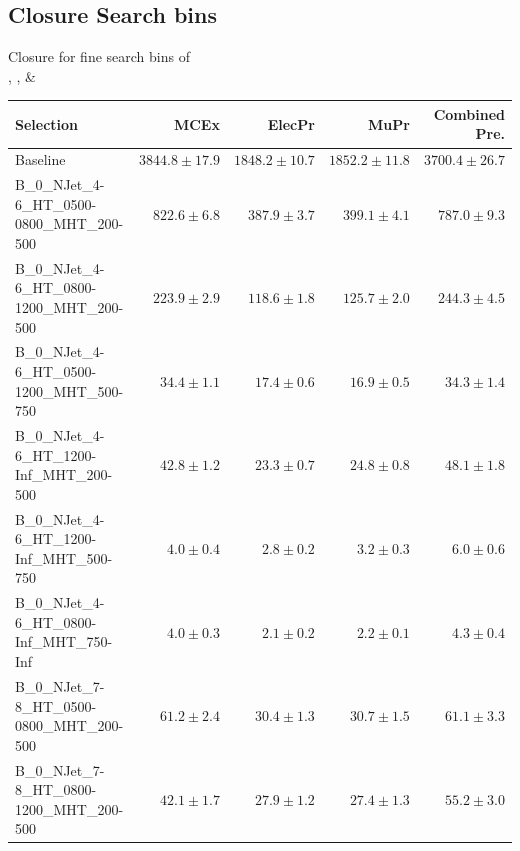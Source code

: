 \documentclass{beamer}
\begin{document}
\subsection{Closure Search bins}
\begin{frame}
 \begin{center}
    {\Large Closure for fine search bins of\\ \HT, \MHT, \NJets \& \BTags}
  \end{center}
\end{frame}
\begin{frame}
\tiny
\begin{tabular}{lrrrr}
\toprule

                                                Selection  &                     MCEx  &           ElecPr  &             MuPr  &          Combined Pre.  \\
\midrule
                                         Baseline &           $3844.8\pm17.9$&           $1848.2\pm10.7$&           $1852.2\pm11.8$&               $3700.4\pm26.7$ \\
     B\_0\_NJet\_4-6\_HT\_0500-0800\_MHT\_200-500 &             $822.6\pm6.8$&             $387.9\pm3.7$&             $399.1\pm4.1$&                 $787.0\pm9.3$ \\
     B\_0\_NJet\_4-6\_HT\_0800-1200\_MHT\_200-500 &             $223.9\pm2.9$&             $118.6\pm1.8$&             $125.7\pm2.0$&                 $244.3\pm4.5$ \\
     B\_0\_NJet\_4-6\_HT\_0500-1200\_MHT\_500-750 &              $34.4\pm1.1$&              $17.4\pm0.6$&              $16.9\pm0.5$&                  $34.3\pm1.4$ \\
      B\_0\_NJet\_4-6\_HT\_1200-Inf\_MHT\_200-500 &              $42.8\pm1.2$&              $23.3\pm0.7$&              $24.8\pm0.8$&                  $48.1\pm1.8$ \\
      B\_0\_NJet\_4-6\_HT\_1200-Inf\_MHT\_500-750 &               $4.0\pm0.4$&               $2.8\pm0.2$&               $3.2\pm0.3$&                   $6.0\pm0.6$ \\
      B\_0\_NJet\_4-6\_HT\_0800-Inf\_MHT\_750-Inf &               $4.0\pm0.3$&               $2.1\pm0.2$&               $2.2\pm0.1$&                   $4.3\pm0.4$ \\
     B\_0\_NJet\_7-8\_HT\_0500-0800\_MHT\_200-500 &              $61.2\pm2.4$&              $30.4\pm1.3$&              $30.7\pm1.5$&                  $61.1\pm3.3$ \\
     B\_0\_NJet\_7-8\_HT\_0800-1200\_MHT\_200-500 &              $42.1\pm1.7$&              $27.9\pm1.2$&              $27.4\pm1.3$&                  $55.2\pm3.0$ \\

\end{tabular}
\end{frame}
\end{document}
